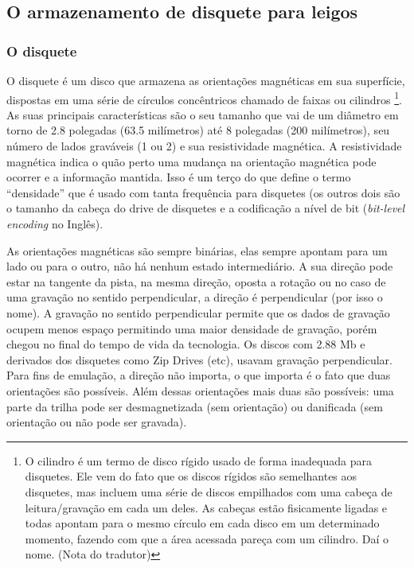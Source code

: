 \documentclass[letterpaper,10pt,brazil]{sphinxmanual}
\begin{document}
\subsection{O armazenamento de disquete para leigos}
\label{techspecs/floppy:o-armazenamento-de-disquete-para-leigos}

\subsubsection{O disquete}
\label{techspecs/floppy:o-disquete}
O disquete é um disco que armazena as orientações magnéticas em sua
superfície, dispostas em uma série de círculos concêntricos chamado de
faixas ou cilindros \footnote[1]{\sphinxAtStartFootnote%
O cilindro é um termo de disco rígido usado de forma inadequada
para disquetes. Ele vem do fato que os discos rígidos são
semelhantes aos disquetes, mas incluem uma série de discos
empilhados com uma cabeça de leitura/gravação em cada um deles.
As cabeças estão fisicamente ligadas e todas apontam para o
mesmo círculo em cada disco em um determinado momento, fazendo
com que a área acessada pareça com um cilindro.
Daí o nome. (Nota do tradutor)
}. As suas principais características são o seu
tamanho que vai de um diâmetro em torno de 2.8 polegadas
(63.5 milímetros) até 8 polegadas (200 milímetros), seu número de lados
graváveis (1 ou 2) e sua resistividade magnética. A resistividade
magnética indica o quão perto uma mudança na orientação magnética pode
ocorrer e a informação mantida.
Isso é um terço do que define o termo ``densidade'' que é usado com tanta
frequência para disquetes (os outros dois são o tamanho da cabeça do
drive de disquetes e a codificação a nível de bit (\emph{bit-level encoding}
no Inglês).

As orientações magnéticas são sempre binárias, elas sempre apontam para
um lado ou para o outro, não há nenhum estado intermediário. A sua
direção pode estar na tangente da pista, na mesma direção, oposta a
rotação ou no caso de uma gravação no sentido perpendicular, a direção é
perpendicular (por isso o nome). A gravação no sentido perpendicular
permite que os dados de gravação ocupem menos espaço permitindo uma
maior densidade de gravação, porém chegou no final do tempo de vida da
tecnologia. Os discos com 2.88 Mb e derivados dos disquetes como Zip
Drives (etc), usavam gravação perpendicular. Para fins de emulação, a
direção não importa, o que importa é o fato que duas orientações são
possíveis. Além dessas orientações mais duas são possíveis: uma parte da
trilha pode ser desmagnetizada (sem orientação) ou danificada (sem
orientação ou não pode ser gravada).
\end{document}
